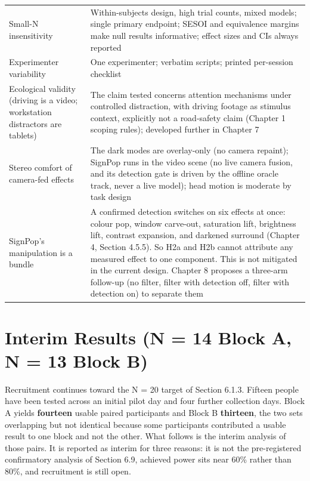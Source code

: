\begin{longtable}{p{}|p{}}
Small-N insensitivity & Within-subjects design, high trial counts, mixed models; single primary endpoint; SESOI and equivalence margins make null results informative; effect sizes and CIs always reported \\
Experimenter variability & One experimenter; verbatim scripts; printed per-session checklist \\
Ecological validity (driving is a video; workstation distractors are tablets) & The claim tested concerns attention mechanisms under controlled distraction, with driving footage as stimulus context, explicitly not a road-safety claim (Chapter 1 scoping rules); developed further in Chapter 7 \\
Stereo comfort of camera-fed effects & The dark modes are overlay-only (no camera repaint); SignPop runs in the video scene (no live camera fusion, and its detection gate is driven by the offline oracle track, never a live model); head motion is moderate by task design \\
SignPop's manipulation is a bundle & A confirmed detection switches on six effects at once: colour pop, window carve-out, saturation lift, brightness lift, contrast expansion, and darkened surround (Chapter 4, Section 4.5.5). So H2a and H2b cannot attribute any measured effect to one component. This is not mitigated in the current design. Chapter 8 proposes a three-arm follow-up (no filter, filter with detection off, filter with detection on) to separate them \\
\hline
\end{longtable}

\section{Interim Results (N = 14 Block A, N = 13 Block B)}

Recruitment continues toward the N = 20 target of Section 6.1.3. Fifteen people have been tested
across an initial pilot day and four further collection days. Block A yields \textbf{fourteen} usable
paired participants and Block B \textbf{thirteen}, the two sets overlapping but not identical because
some participants contributed a usable result to one block and not the other. What follows is the
interim analysis of those pairs. It is reported as interim for three reasons: it is not the
pre-registered confirmatory analysis of Section 6.9, achieved power sits near 60\% rather than 80\%,
and recruitment is still open.

